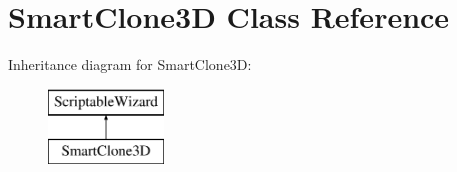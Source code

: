 \hypertarget{class_smart_clone3_d}{}\section{Smart\+Clone3D Class Reference}
\label{class_smart_clone3_d}
Inheritance diagram for Smart\+Clone3D\+:\begin{figure}[H]
\begin{center}
\leavevmode
\includegraphics[height=2.000000cm]{class_smart_clone3_d}
\end{center}
\end{figure}
